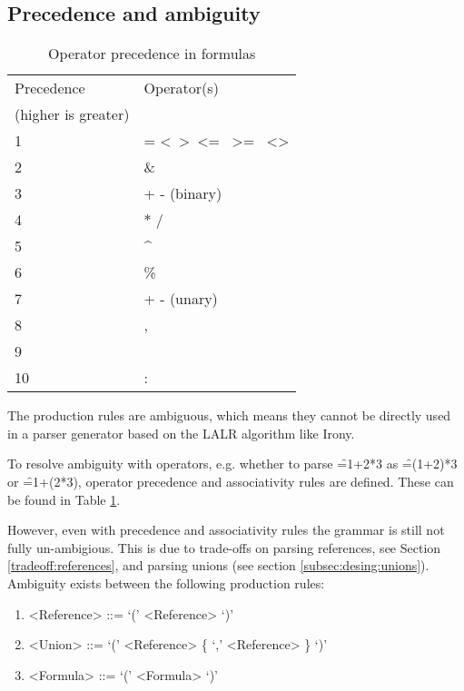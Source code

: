 \subsection{Precedence and ambiguity}
\label{sec:ambiguity}

\begin{table}
\small
\begin{tabular}{ll}
	\toprule
	Precedence & Operator(s) \\
	(higher is greater) & \\
	\midrule
	1 & = \textless \  \textgreater \  \textless= \  \textgreater= \  \textless\textgreater          \\
	2 & \&  \\
	3 & + - (binary) \\
	4 & $\ast$ / \\
	5 & \textasciicircum \\
	6 & \% \\
	7 & + - (unary) \\
	8 & , \\
	9 & \texttt{\char32} \\
	10 & : \\
	\bottomrule
\end{tabular}
\caption{Operator precedence in formulas}
\label{table:operatorprec}
\end{table}


The production rules are ambiguous, which means they cannot be directly used in a parser generator based on the LALR algorithm like Irony.

To resolve ambiguity with operators, e.g. whether to parse \f{=1+2*3} as \f{=(1+2)*3} or \f{=1+(2*3)}, operator precedence and associativity rules are defined.
These can be found in Table \ref{table:operatorprec}.

However, even with precedence and associativity rules the grammar is still not fully un-ambigious.
This is due to trade-offs on parsing references, see Section \ref{tradeoff:references}, and parsing unions (see section \ref{subsec:desing:unions}).
Ambiguity exists between the following production rules:
\begin{enumerate}
	\item \begin{grammar}<Reference> ::= `(' <Reference> `)'\end{grammar}
	\item \begin{grammar}<Union> ::= `(' <Reference> \{ `,' <Reference> \} `)'\end{grammar}
	\item \begin{grammar}<Formula> ::= `(' <Formula> `)'\end{grammar}
\end{enumerate}

